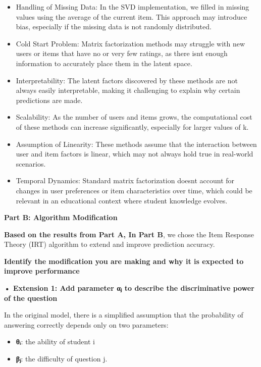 \begin{itemize}
\item
  Handling of Missing Data: In the SVD implementation, we filled in
  missing values using the average of the current item. This approach
  may introduce bias, especially if the missing data is not randomly
  distributed.
\item
  Cold Start Problem: Matrix factorization methods may struggle with new
  users or items that have no or very few ratings, as there
  isn\textquotesingle t enough information to accurately place them in
  the latent space.
\item
  Interpretability: The latent factors discovered by these methods are
  not always easily interpretable, making it challenging to explain why
  certain predictions are made.
\item
  Scalability: As the number of users and items grows, the computational
  cost of these methods can increase significantly, especially for
  larger values of k.
\item
  Assumption of Linearity: These methods assume that the interaction
  between user and item factors is linear, which may not always hold
  true in real-world scenarios.
\item
  Temporal Dynamics: Standard matrix factorization
  doesn\textquotesingle t account for changes in user preferences or
  item characteristics over time, which could be relevant in an
  educational context where student knowledge evolves.
\end{itemize}

\textbf{Part B: Algorithm Modification}

\textbf{Based on the results from Part A, In Part B}, we chose the Item
Response Theory (IRT) algorithm to extend and improve prediction
accuracy.

\textbf{Identify the modification you are making and why it is expected
to improve performance}

\textbf{• Extension 1: Add parameter αⱼ to describe the discriminative
power of the question}

In the original model, there is a simplified assumption that the
probability of answering correctly depends only on two parameters:

\begin{itemize}
\item
  \textbf{θᵢ}: the ability of student i
\item
  \textbf{βⱼ}: the difficulty of question j.
\end{itemize}

